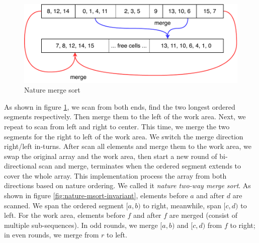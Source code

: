 \documentclass[b5paper]{article}
\begin{document}
\begin{figure}[htbp]
 \centering
 \includegraphics[scale=0.8]{img/nature-merge-sort}
 \caption{Nature merge sort}
 \label{fig:nature-merge-sort}
\end{figure}

As shown in figure \ref{fig:nature-merge-sort}, we scan from both ends, find the two longest ordered segments respectively. Then merge them to the left of the work area. Next, we repeat to scan from left and right to center. This time, we merge the two segments for the right to left of the work area. We switch the merge direction right/left in-turns. After scan all elements and merge them to the work area, we swap the original array and the work area, then start a new round of bi-directional scan and merge, terminates when the ordered segment extends to cover the whole array. This implementation process the array from both directions based on nature ordering. We called it {\em nature two-way merge sort}. As shown in figure \ref{fig:nature-msort-invariant}, elements before $a$ and after $d$ are scanned. We span the ordered segment $[a, b)$ to right, meanwhile, span $[c, d)$ to left. For the work area, elements before $f$ and after $f$ are merged (consist of multiple sub-sequences). In odd rounds, we merge $[a, b)$ and $[c, d)$ from $f$ to right; in even rounds, we merge from $r$ to left.
\end{document}
